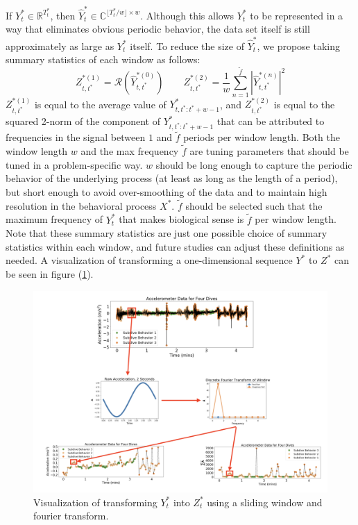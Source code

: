 If $Y^*_t \in \mathbb{R}^{T^*_t}$, then $\hat{Y}_t^* \in \mathbb{C}^{\lfloor T^*_t / w \rfloor \times w}$. Although this allows $Y^*_t$ to be represented in a way that eliminates obvious periodic behavior, the data set itself is still approximately as large as $Y^*_t$ itself. To reduce the size of $\hat{Y}^*_t$, we propose taking summary statistics of each window as follows:
%
$$Z_{t,t^*}^{*(1)} = \mathcal{R}\left(\hat{Y}^{*(0)}_{t,t^*}\right) \qquad Z_{t,t^*}^{*(2)} = \frac{1}{w}\sum_{n=1}^{\tilde{f}}|\hat{Y}^{*(n)}_{t,t^*}|^2$$
%
$Z_{t,t^*}^{*(1)}$ is equal to the average value of $Y_{t,t^*:t^*+w-1}^*$, and $Z_{t,t^*}^{*(2)}$ is equal to the squared 2-norm of the component of $Y_{t,t^*:t^*+w-1}^*$ that can be attributed to frequencies in the signal between $1$ and $\tilde{f}$ periods per window length. Both the window length $w$ and the max frequency $\tilde{f}$ are tuning parameters that should be tuned in a problem-specific way. $w$ should be long enough to capture the periodic behavior of the underlying process (at least as long as the length of a period), but short enough to avoid over-smoothing of the data and to maintain high resolution in the behavioral process $X^*$. $\tilde{f}$ should be selected such that the maximum frequency of $Y_t^*$ that makes biological sense is $\tilde{f}$ per window length. Note that these summary statistics are just one possible choice of summary statistics within each window, and future studies can adjust these definitions as needed. A visualization of transforming a one-dimensional sequence $Y^*$ to $Z^*$ can be seen in figure (\ref{fig:fourier_example}).

\begin{figure}[h!]
	\centering
	\includegraphics[width=7.5in]{../Plots/fourier_transform.png}
	\caption{Visualization of transforming $Y^*_t$ into $Z^*_t$ using a sliding window and fourier transform.}
	\label{fig:fourier_example}
\end{figure}

